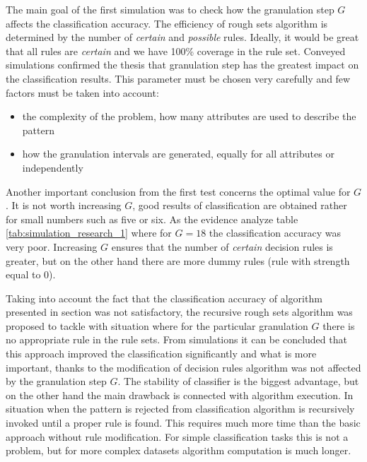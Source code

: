 The main goal of the first simulation was to check how the granulation step $G$
affects the classification accuracy. The efficiency of rough sets algorithm is
determined by the number of \textit{certain} and \textit{possible} rules. Ideally, it would be
great that all rules are \textit{certain} and we have 100\% coverage in the rule set.
Conveyed simulations confirmed the thesis that granulation step has the
greatest impact on the classification results. This parameter must be chosen
very carefully and few factors must be taken into account:
\begin{itemize}
    \item the complexity of the problem, how many attributes are used to
        describe the pattern
    \item how the granulation intervals are generated, equally for all
        attributes or independently
\end{itemize}
Another important conclusion from the first test concerns the optimal value for
$G$. It is not worth increasing $G$, good results of classification are
obtained rather for small numbers such as five or six. As the evidence analyze
table \ref{tab:simulation_research_1} where for $G=18$ the classification accuracy
was very poor. Increasing $G$ ensures that the number of \textit{certain} decision rules
is greater, but on the other hand there are more dummy rules (rule with
strength equal to 0). 

Taking into account the fact that the classification accuracy of algorithm
presented in section \label{cha:Simulation_reaearch_1} was not satisfactory,
the recursive rough sets algorithm was proposed to tackle with situation where
for the particular granulation $G$ there is no appropriate rule in the rule sets. From
simulations it can be concluded that this approach improved the classification
significantly and what is more important, thanks to the modification of
decision rules algorithm was not affected by the granulation step $G$. The stability
of classifier is the biggest advantage, but on the other hand the main drawback
is connected with algorithm execution. In situation when the pattern is rejected
from classification algorithm is recursively invoked until a proper rule is
found. This requires much more time than the basic approach without rule
modification.  For simple classification tasks this is not a problem, but for
more complex datasets algorithm computation is much longer.

